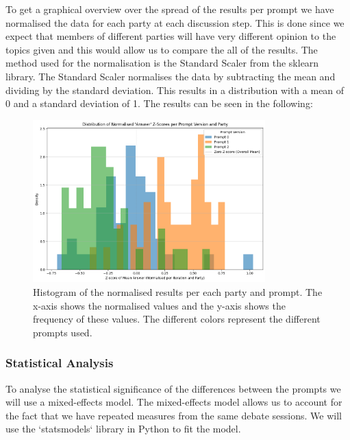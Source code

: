 \documentclass[12pt]{article}
\begin{document}
To get a graphical overview over the spread of the results per prompt we have normalised the data for each party at each discussion step. This is done since we expect that members of different parties will have very different opinion to the topics given and this would allow us to compare the all of the results. The method used for the normalisation is the Standard Scaler from the sklearn library. The Standard Scaler normalises the data by subtracting the mean and dividing by the standard deviation. This results in a distribution with a mean of 0 and a standard deviation of 1. The results can be seen in the following: 

\begin{figure}[h!]
\centering
\includegraphics[width=0.8\textwidth]{img/normalised_results.png}
\caption{Histogram of the normalised results per each party and prompt. The x-axis shows the normalised values and the y-axis shows the frequency of these values. The different colors represent the different prompts used.}
\label{fig:normalised_results}
\end{figure}


\subsubsection{Statistical Analysis}

To analyse the statistical significance of the differences between the prompts we will use a mixed-effects model. The mixed-effects model allows us to account for the fact that we have repeated measures from the same debate sessions. We will use the `statsmodels` library in Python to fit the model.
\end{document}
